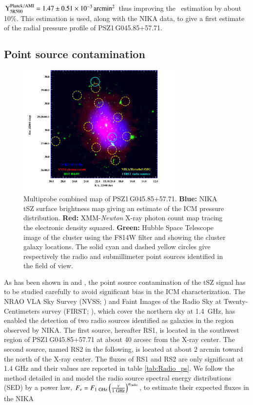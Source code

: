 \documentclass[traditabstract]{aa}
\begin{document}
\mbox{$\rm{Y_{5R500}^{\rm{Planck/AMI}}} = 1.47 \pm 0.51 \times 10^{-3} \, \mathrm{arcmin^2}$} thus improving the \planck\ estimation by about 10\%. This estimation is used, along with the NIKA data, to give a first estimate of the radial pressure profile of \mbox{PSZ1\,G045.85+57.71}.

\subsection{Point source contamination}\label{sec:point_source}

\begin{figure}[h]
\centering
\includegraphics[height=6.6cm]{combine3.pdf}
\caption{{\footnotesize Multiprobe combined map of \mbox{PSZ1\,G045.85+57.71}. \textbf{Blue:} NIKA tSZ surface brightness map giving an estimate of the ICM pressure distribution. \textbf{Red:} XMM-{\it Newton} X-ray photon count map tracing the electronic density squared. \textbf{Green:} Hubble Space Telescope image of the cluster using the F814W filter and showing the cluster galaxy locations. The solid cyan and dashed yellow circles give respectively the radio and submillimeter point sources identified in the field of view.}}
\label{fig:rgb_image}
\end{figure}
As has been shown in \citealt{SayersPointSource} and \citealt{MACSJ1424NIKA}, the point source contamination of the tSZ signal has to be studied carefully to avoid significant bias in the ICM characterization. The NRAO VLA Sky Survey (NVSS; \citealt{Condon1998}) and Faint Images of the Radio Sky at Twenty-Centimeters survey (FIRST; \citealt{Becker1995}), which cover the northern sky at 1.4~GHz, has enabled the detection of two radio sources identified as galaxies in the region observed by NIKA. The first source, hereafter RS1, is located in the southwest region of \mbox{PSZ1\,G045.85+57.71} at about 40 arcsec from the X-ray center. The second source, named RS2 in the following, is located at about 2 arcmin toward the north of the X-ray center. The fluxes of RS1 and RS2 are only significant at 1.4 GHz and their values are reported in table \ref{tab:Radio_ps}. We follow the method detailed in \citealt{MACSJ1424NIKA} and model the radio source spectral energy distributions (SED) by a power law, $F_{\nu} = F_{\rm{1~GHz}}\left(\frac{\nu}{\rm{1~GHz}}\right)^{\alpha_{\rm{radio}}}$, to estimate their expected fluxes in the NIKA
\end{document}
